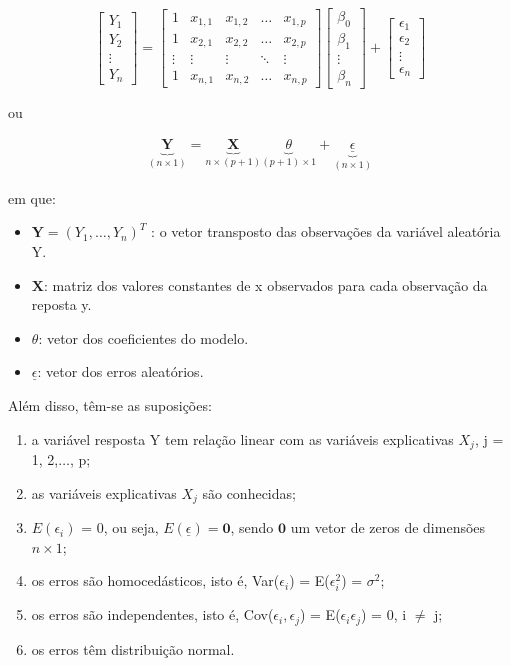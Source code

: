 \documentclass[
	12pt,				%
	a4paper,		%
	oneside,    %
	chapter=TITLE,		   %
	section=TITLE,		   %
	subsection=TITLE,	   %
	subsubsection=TITLE, %
	english,			%
	french,				%
	spanish,			%
	brazil,				%
]{abntex2}
\begin{document}
\[
\begin{bmatrix}
Y_1 \\
Y_2 \\
\vdots \\
Y_n
\end{bmatrix}
=
\begin{bmatrix}
1 & x_{1,1} & x_{1,2} & \dots & x_{1,p} \\
1 & x_{2,1} & x_{2,2} & \dots & x_{2,p} \\
\vdots & \vdots & \vdots & \ddots & \vdots \\
1 & x_{n,1} & x_{n,2} & \dots & x_{n,p}
\end{bmatrix}
\begin{bmatrix}
\beta_0 \\
\beta_1 \\
\vdots \\
\beta_n
\end{bmatrix}
+
\begin{bmatrix}
\epsilon_1 \\
\epsilon_2 \\
\vdots \\
\epsilon_n
\end{bmatrix}
\]

ou

\[
\begin{matrix}
\underbrace{\textbf{Y}}_{(n\times 1)} 
= 
\underbrace{\textbf{X}}_{n\times(p+1)}
\underbrace{\theta}_{(p+1)\times1}
+
\underbrace{\underline{ \epsilon}}_{(n\times 1)}
\end{matrix}
\]

em que:

\begin{itemize}
\item
  \(\textbf{Y} = (Y_1,\dots , Y_n)^T\) : o vetor transposto das
  observações da variável aleatória Y.
\item
  \(\textbf{X}\): matriz dos valores constantes de x observados para
  cada observação da reposta y.
\item
  \(\theta\): vetor dos coeficientes do modelo.
\item
  \(\underline{ \epsilon}\): vetor dos erros aleatórios.
\end{itemize}

Além disso, têm-se as suposições:

\begin{enumerate}[label=(\roman*)]
\item a variável resposta Y tem relação linear com as variáveis explicativas $X_j$, j = 1, 2,$\dots$, p;
\item as variáveis explicativas $X_j$ são conhecidas;
\item $E(\epsilon_i)$ = 0, ou seja, $E(\underline{ \epsilon}) = \textbf{0}$, sendo $\textbf{0}$ um vetor de zeros de dimensões $n \times 1$;
\item os erros são homocedásticos, isto é, Var($\epsilon_i$) = E($\epsilon_i^2$) = $\sigma^2$;
\item os erros são independentes, isto é, Cov($\epsilon_i,\epsilon_{j}$) = E($\epsilon_i \epsilon_{j}$) = 0, i $\neq$ j;
\item os erros têm distribuição normal.
\end{enumerate}
\end{document}
